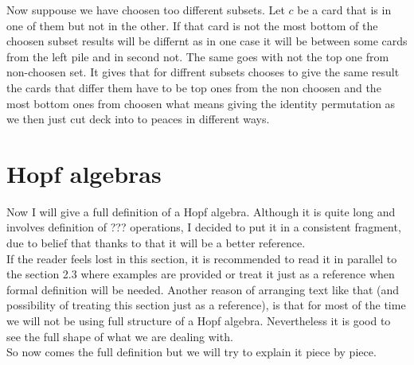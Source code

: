\documentclass[a4paper, 12pt]{article}
\begin{document}
Now suppouse we have choosen too different subsets. Let $c$ be a card that is in one of them but not in the
other. If that card is not the most bottom of the choosen subset results will be differnt as in one case
it will be between some cards from the left pile and in second not. The same goes with not the top one
from non-choosen set. It gives that for diffrent subsets chooses to give the same result the cards that
differ them have to be top ones from the non choosen and the most bottom ones from choosen what means
giving the identity permutation as we then just cut deck into to peaces in different ways.
\section{Hopf algebras}
%
Now I will give a full definition of a Hopf algebra. Although it is quite long and involves
definition of ??? operations, I decided to put it in a consistent fragment, due to belief
that thanks to that it will be a better reference. \\
If the reader feels lost in this section, it is recommended to read it in parallel to the section 2.3
where examples are provided or treat it just as a reference when formal definition will be needed.
Another reason of arranging text like that (and possibility of treating this section just as a reference),
is that for most of the time we will not be using full structure of a Hopf algebra. Nevertheless it is good
to see the full shape of what we are dealing with. \\
So now comes the full definition but we will try to explain it piece by piece. \\[8pt]
\end{document}
